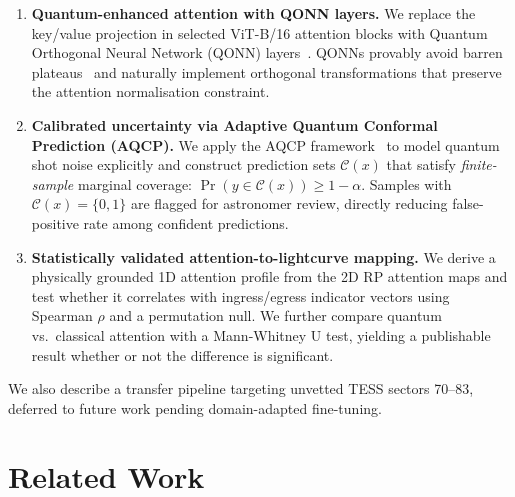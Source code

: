 \documentclass{article}
\begin{document}
\begin{enumerate}
  \item \textbf{Quantum-enhanced attention with QONN layers.}
  We replace the key/value projection in selected ViT-B/16 attention blocks
  with Quantum Orthogonal Neural Network (QONN) layers~\citep{tesi2024}.
  QONNs provably avoid barren plateaus~\citep{mcclean2018} and naturally
  implement orthogonal transformations that preserve the attention
  normalisation constraint.

  \item \textbf{Calibrated uncertainty via Adaptive Quantum Conformal Prediction (AQCP).}
  We apply the AQCP framework~\citep{aqcp2025} to model quantum shot noise
  explicitly and construct prediction sets $\mathcal{C}(x)$ that satisfy
  \emph{finite-sample} marginal coverage: $\Pr(y \in \mathcal{C}(x)) \geq 1-\alpha$.
  Samples with $\mathcal{C}(x) = \{0,1\}$ are flagged for astronomer review,
  directly reducing false-positive rate among confident predictions.

  \item \textbf{Statistically validated attention-to-lightcurve mapping.}
  We derive a physically grounded 1D attention profile from the 2D RP
  attention maps and test whether it correlates with ingress/egress
  indicator vectors using Spearman $\rho$ and a permutation null.
  We further compare quantum vs.\ classical attention with a Mann-Whitney U
  test, yielding a publishable result whether or not the difference is significant.
\end{enumerate}

We also describe a transfer pipeline targeting unvetted TESS sectors 70--83,
deferred to future work pending domain-adapted fine-tuning.

\section{Related Work}
\label{sec:related}
\end{document}
